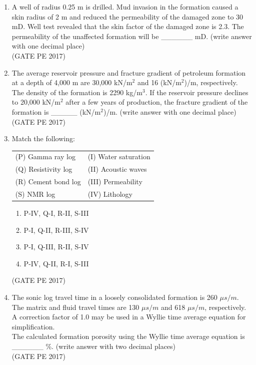 \documentclass[journal,12pt,onecolumn]{IEEEtran}
\theoremstyle{remark}
\begin{document}
\begin{enumerate}[start=1, label={Q\arabic*.}]
\item A well of radius 0.25 m is drilled. Mud invasion in the formation caused a skin radius of 2 m and reduced the permeability of the damaged zone to 30 mD. Well test revealed that the skin factor of the damaged zone is 2.3.
The permeability of the unaffected formation will be \_\_\_\_\_\_ mD. (write answer with one decimal place)\\

\hfill{(GATE PE 2017)}

\item The average reservoir pressure and fracture gradient of petroleum formation at a depth of 4,000 m are 30,000 kN/m$^2$ and 16 (kN/m$^2$)/m, respectively.
The density of the formation is 2290 kg/m$^3$. If the reservoir pressure declines to 20,000 kN/m$^2$ after a few years of production, the fracture gradient of the formation is \_\_\_\_\_ (kN/m$^2$)/m. (write answer with one decimal place)\\

\hfill{(GATE PE 2017)}

\item Match the following:\\

\begin{tabular}{ll}
(P) Gamma ray log & (I) Water saturation \\
(Q) Resistivity log & (II) Acoustic waves \\
(R) Cement bond log & (III) Permeability \\
(S) NMR log & (IV) Lithology \\
\end{tabular}
\begin{enumerate}
\item P-IV, Q-I, R-II, S-III \\
\item P-I, Q-II, R-III, S-IV \\
\item P-I, Q-III, R-II, S-IV \\
\item P-IV, Q-II, R-I, S-III
\end{enumerate}
\hfill{(GATE PE 2017)}

\item The sonic log travel time in a loosely consolidated formation is 260 $\mu s/m$. The matrix and fluid travel times are 130 $\mu s/m$ and 618 $\mu s/m$, respectively. A correction factor of 1.0 may be used in a Wyllie time average equation for simplification.\\[1ex]
The calculated formation porosity using the Wyllie time average equation is \_\_\_\_\_\_ \%. (write answer with two decimal places)\\
\hfill{(GATE PE 2017)}


\end{enumerate}
\end{document}
